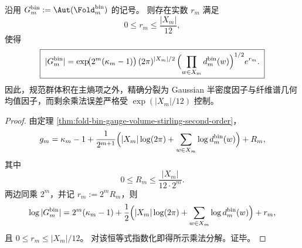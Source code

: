 \begin{theorem}[规范群体积的三因子精确乘法分解]\label{thm:xi-foldbin-gauge-volume-three-factor-product}
沿用
\(
G_m^{\mathrm{bin}}:=\Aut(\Fold_m^{\mathrm{bin}})
\)
的记号。
则存在实数 \(r_m\) 满足
\[
0\le r_m\le \frac{|X_m|}{12},
\]
使得
\[
\boxed{\;
|G_m^{\mathrm{bin}}|
=
\exp\!\bigl(2^m(\kappa_m-1)\bigr)\,
(2\pi)^{|X_m|/2}\,
\Bigl(\prod_{w\in X_m}d_m^{\mathrm{bin}}(w)\Bigr)^{1/2}
e^{r_m}.\;}
\]
因此，规范群体积在主熵项之外，精确分裂为 Gaussian 半密度因子与纤维谱几何均值因子，而剩余乘法误差严格受
\(
\exp(|X_m|/12)
\)
控制。
\end{theorem}
\begin{proof}
由定理 \ref{thm:fold-bin-gauge-volume-stirling-second-order}，
\[
g_m
=
\kappa_m-1+\frac{1}{2^{m+1}}
\Bigl(
|X_m|\log(2\pi)+\sum_{w\in X_m}\log d_m^{\mathrm{bin}}(w)
\Bigr)+R_m,
\]
其中
\[
0\le R_m\le \frac{|X_m|}{12\cdot 2^m}.
\]
两边同乘 \(2^m\)，并记
\(
r_m:=2^mR_m
\)，则
\[
\log|G_m^{\mathrm{bin}}|
=
2^m(\kappa_m-1)
+\frac12\Bigl(
|X_m|\log(2\pi)+\sum_{w\in X_m}\log d_m^{\mathrm{bin}}(w)
\Bigr)
+r_m,
\]
且 \(0\le r_m\le |X_m|/12\)。
对该恒等式指数化即得所示乘法分解。证毕。
\end{proof}

